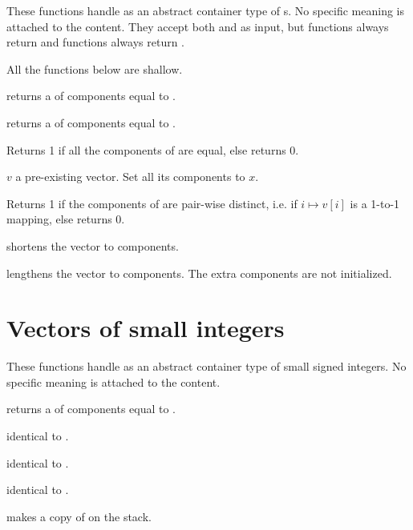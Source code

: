 
These functions handle  as an abstract container type of
s. No specific meaning is attached to the content. They accept both
 and  as input, but  functions always return
 and  functions always return .

 All the functions below are shallow.

 returns a  of  components
equal to .

 returns a  of  components
equal to .

 Returns 1 if all the components of  are
equal, else returns 0.

 $v$ a pre-existing vector. Set all its
components to $x$.

  Returns 1 if the components of  are
pair-wise distinct, i.e. if $i\mapsto v[i]$ is a 1-to-1 mapping, else returns
0.

 shortens the vector  to 
components.

 lengthens the vector 
to  components. The extra components are not initialized.

\section{Vectors of small integers}


These functions handle  as an abstract container type
of small signed integers. No specific meaning is attached to the content.

 returns a 
of  components equal to .

 identical to .

 identical to .

 identical to .

 makes a copy of  on the stack.

